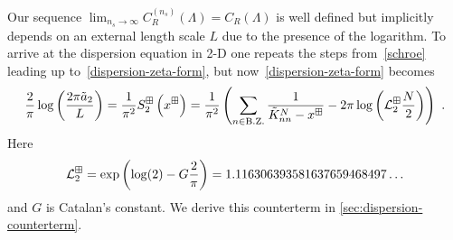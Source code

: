Our sequence $\lim_{n_s\to\infty}C^{(n_s)}_R(\Lambda) = C_R(\Lambda)$ is well defined but implicitly depends on an external length scale $L$ due to the presence of the logarithm.  To arrive at the dispersion equation in 2-D one repeats the steps from~\eqref{schroe} leading up to~\eqref{dispersion-zeta-form}, but now~\eqref{dispersion-zeta-form} becomes
\begin{equation}
    \frac{2}{\pi} \log \left(\frac{2\pi \tilde a_{2}}{L}\right)=\frac{1}{\pi^2}S^{\boxplus}_2\left(x^\boxplus\right)
    =
    \frac{1}{\pi^2}
    \left(
        \sum_{n\in\operatorname{B.Z.}}\frac{1}{\tilde{K}^N_{nn}-x^\boxplus}
        -2\pi \log \left(\mathcal{L}^\boxplus_2\frac{N}{2}\right)
    \right)\ .
\end{equation}
Here
\begin{equation}
    \mathcal{L}^\boxplus_{2}
    =
    \exp \left(\log (2)-G \frac{2}{\pi}\right)
    =
    1.116306393581637659468497 \ldots
\end{equation}
and $G$ is Catalan's constant.  We derive this counterterm in \ref{sec:dispersion-counterterm}.



